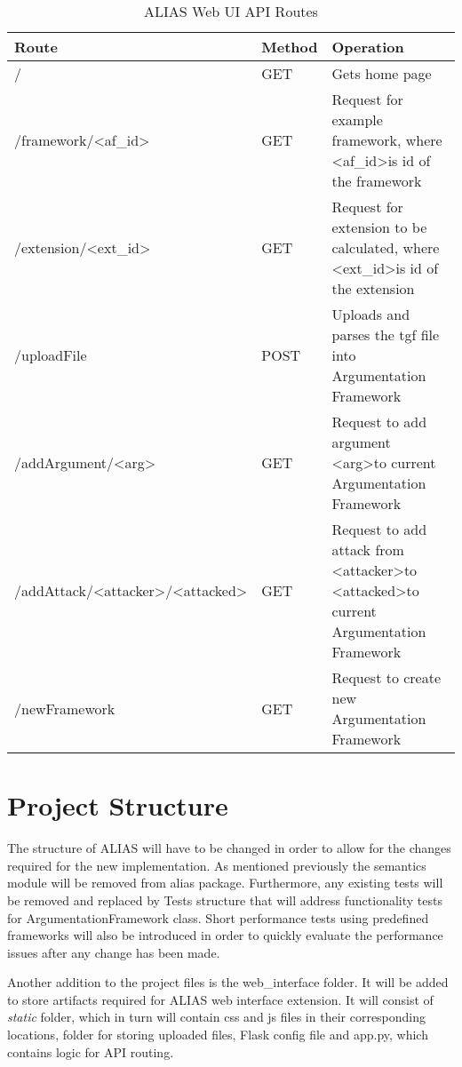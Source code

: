 \begin{table}[]
	\centering
		\begin{tabular}{|p{7cm}|p{1.5cm}|p{4.5cm}|}
			\hline
			\textbf{Route} & \textbf{Method} & \textbf{Operation}  \\ \hline \hline
			/ & GET & Gets home page \\ \hline
			/framework/\textless{}af\_id\textgreater{} & GET & Request for example framework, where \textless{}af\_id\textgreater is id of the framework \\ \hline
			/extension/\textless{}ext\_id\textgreater{} & GET & Request for extension to be calculated, where \textless{}ext\_id\textgreater is id of the extension \\ \hline
			/uploadFile & POST & Uploads and parses the tgf file into Argumentation Framework \\ \hline
			/addArgument/\textless{}arg\textgreater{} & GET & Request to add argument \textless{}arg\textgreater to current Argumentation Framework \\ \hline
			/addAttack/\textless{}attacker\textgreater{}/\textless{}attacked\textgreater{} & GET & Request to add attack from \textless{}attacker\textgreater to \textless{}attacked\textgreater to current Argumentation Framework \\ \hline
			/newFramework & GET & Request to create new Argumentation Framework \\ \hline
		\end{tabular}%
	\caption{ALIAS Web UI API Routes}
	\label{table:apiRoutes}
\end{table}

\section{Project Structure}
The structure of ALIAS will have to be changed in order to allow for the changes required for the new implementation. As mentioned previously the semantics module will be removed from alias package. Furthermore, any existing tests will be removed and replaced by Tests structure that will address functionality tests for ArgumentationFramework class. Short performance tests using predefined frameworks will also be introduced in order to quickly evaluate the performance issues after any change has been made.

Another addition to the project files is the web\_interface folder. It will be added to store artifacts required for ALIAS web interface extension. It will consist of \textit{static} folder, which in turn will contain css and js files in their corresponding locations, folder for storing uploaded files, Flask config file and app.py, which contains logic for API routing.

